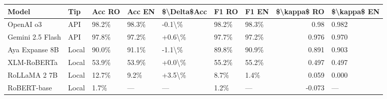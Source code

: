 \begin{tabular}{lllllllrl}
\toprule
 Model            & Tip   & Acc RO   & Acc EN   & \$\textbackslash{}Delta\$Acc   & F1 RO   & F1 EN   &   \$\textbackslash{}kappa\$ RO & \$\textbackslash{}kappa\$ EN   \\
\midrule
 OpenAI o3        & API   & 98.2\%    & 98.3\%    & -0.1\textbackslash{}\%        & 98.2\%   & 98.3\%   &         0.98  & 0.982         \\
 Gemini 2.5 Flash & API   & 97.8\%    & 97.2\%    & +0.6\textbackslash{}\%        & 97.7\%   & 97.2\%   &         0.976 & 0.970         \\
 Aya Expanse 8B   & Local & 90.0\%    & 91.1\%    & -1.1\textbackslash{}\%        & 89.8\%   & 90.9\%   &         0.891 & 0.903         \\
 XLM-RoBERTa      & Local & 53.9\%    & 53.9\%    & +0.0\textbackslash{}\%        & 55.2\%   & 55.2\%   &         0.497 & 0.497         \\
 RoLLaMA 2 7B     & Local & 12.7\%    & 9.2\%     & +3.5\textbackslash{}\%        & 8.7\%    & 1.4\%    &         0.059 & 0.000         \\
 RoBERT-base      & Local & 1.7\%     & —        & —             & 1.2\%    & —       &        -0.073 & —             \\
\bottomrule
\end{tabular}